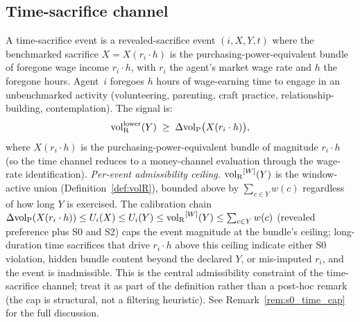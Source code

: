 \subsection{Time-sacrifice channel}

\begin{definition}
\label{def:time_sacrifice}
A time-sacrifice event is a revealed-sacrifice event
$(i, X, Y, t)$ where the benchmarked sacrifice
$X = X(r_i \cdot h)$ is the purchasing-power-equivalent bundle
of foregone wage income $r_i \cdot h$, with $r_i$ the agent's
market wage rate and $h$ the foregone hours.  Agent~$i$ foregoes
$h$ hours of wage-earning time to engage in an unbenchmarked
activity (volunteering, parenting, craft practice,
relationship-building, contemplation).  The signal is:
\[
  {\operatorname{vol}_{\mathrm{R}}^{\mathrm{lower}}}(Y) \;\geq\; \Delta{\operatorname{vol}_{\mathrm{P}}}\bigl(X(r_i \cdot h)\bigr),
\]
where $X(r_i \cdot h)$ is the purchasing-power-equivalent
bundle of magnitude $r_i \cdot h$ (so the time channel reduces
to a money-channel evaluation through the wage-rate
identification).
\emph{Per-event admissibility ceiling.}  ${\operatorname{vol}_{\mathrm{R}}}^{[W]}(Y)$ is
the window-active union (Definition~\ref{def:volR}), bounded
above by $\sum_{c \in Y} w(c)$ regardless of how long $Y$ is
exercised.  The calibration chain
$\Delta{\operatorname{vol}_{\mathrm{P}}}(X(r_i \cdot h)) \leq U_i(X) \leq U_i(Y) \leq
{\operatorname{vol}_{\mathrm{R}}}^{[W]}(Y) \leq \sum_{c \in Y} w(c)$ (revealed preference
plus S0 and S2) caps the event magnitude at the bundle's
ceiling; long-duration time sacrifices that drive
$r_i \cdot h$ above this ceiling indicate either S0
violation, hidden bundle content beyond the declared $Y$, or
mis-imputed $r_i$, and the event is inadmissible.  This is
the central admissibility constraint of the time-sacrifice
channel; treat it as part of the definition rather than a
post-hoc remark (the cap is structural, not a filtering
heuristic).  See Remark~\ref{rem:s0_time_cap} for the full
discussion.
\end{definition}

